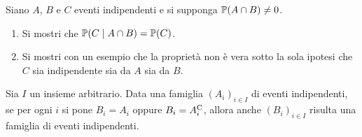 Siano $A$, $B$ e $C$ eventi indipendenti e si supponga $\mathbb{P}( A\cap B) \neq 0$.
\begin{enumerate}
\item Si mostri che $\mathbb{P}( C\mid A\cap B) =\mathbb{P}( C)$.
\item Si mostri con un esempio che la proprietà non è vera sotto la sola ipotesi che $C$ sia indipendente sia da $A$ sia da $B$.
\end{enumerate}
\Esercizio{}

Sia $I$ un insieme arbitrario. Data una famiglia $( A_{i})_{i\in I}$ di eventi indipendenti, se per ogni $i$ si pone $B_{i} =A_{i}$ oppure $B_{i} =A_{i}^{\mathrm{C}}$, allora anche $( B_{i})_{i\in I}$ risulta una famiglia di eventi indipendenti.


\ParteSoluzioni



\Soluzione

